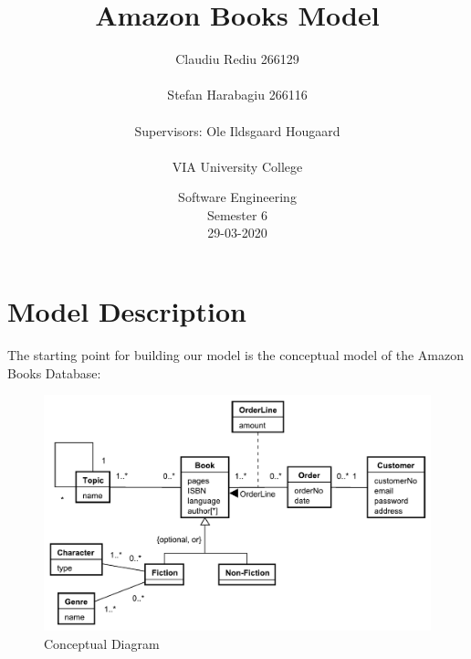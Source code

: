 \documentclass{article}
\title{\Huge Amazon Books Model}
\date{Software Engineering \\  Semester 6 \\  29-03-2020}
\author{Claudiu Rediu 266129\\ \\ Stefan Harabagiu 266116\\ \\ Supervisors: Ole Ildsgaard Hougaard\\ \\ VIA University College}
\begin{document}
	\maketitle
	\newpage
	\newpage
	\section*{Model Description}
	The starting point for building our model is the conceptual model of the Amazon Books Database:\newline
	\begin{figure}[h!]
		\includegraphics[width=\linewidth]{ConceptualModel.pdf}
		\caption{Conceptual Diagram}
		\label{fig:conceptual}
	\end{figure}
	\newline
\end{document}
